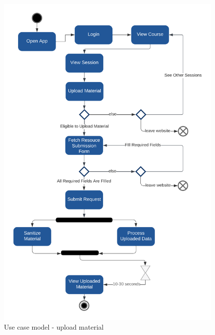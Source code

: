 \begin{figure}[H]
    \centerline{\includegraphics[width=150mm,scale=1]{figures/analysis_and_design/analysis/3. Upload Material.png}}
    \caption{Use case model - upload material}
    \label{uploadMaterial}
\end{figure}



